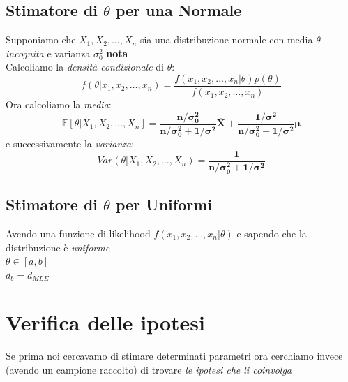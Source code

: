 \documentclass[]{article}
\newcommand{\ev}{\mathbb{E}[X]}
\renewcommand{\ev}[1]{\mathbb{E}[#1]}
\begin{document}
    \subsection{Stimatore di $\theta$ per una Normale}
    Supponiamo che $X_1, X_2, \ldots, X_n$ sia una distribuzione normale con media $\theta$ \textit{incognita} e varianza $\sigma^2_0$ \textbf{nota} \\[2ex]
    Calcoliamo la \textit{densità condizionale} di $\theta$:
    \[ f(\theta \rvert x_1, x_2, \ldots, x_n) = \frac{f(x_1, x_2, \ldots, x_n \rvert \theta) p(\theta)}{f(x_1, x_2, \ldots, x_n)} \]
    Ora calcoliamo la \textit{media}:
    \[ \ev{\theta \rvert X_1, X_2, \ldots, X_n } = \boldsymbol{\frac{n / \sigma^2_0}{n / \sigma^2_0 + 1 / \sigma^2} \overline{X} + \frac{1 / \sigma^2}{n / \sigma^2_0 + 1 / \sigma^2} \mu} \]
    e successivamente la \textit{varianza}:
    \[ Var(\theta \rvert X_1, X_2, \ldots, X_n) = \boldsymbol{\frac{1}{n / \sigma^2_0 + 1 / \sigma^2}} \]
    \subsection{Stimatore di $\theta$ per Uniformi}
    Avendo una funzione di likelihood $f(x_1, x_2, \ldots, x_n \rvert \theta)$ e sapendo che la distribuzione è \textit{uniforme} \\
    $\theta \in [a,b]$ \\
    $d_b = d_{MLE}$
    \section{Verifica delle ipotesi}
    Se prima noi cercavamo di stimare determinati parametri ora cerchiamo invece (avendo un campione raccolto) di trovare \textit{le ipotesi che li coinvolga}
\end{document}

